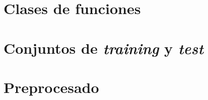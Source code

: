 \documentclass[a4paper, 20pt]{article}
\begin{document}
\section{Clases de funciones}

\section{Conjuntos de \textit{training} y \textit{test}}

\section{Preprocesado}

\end{document}
